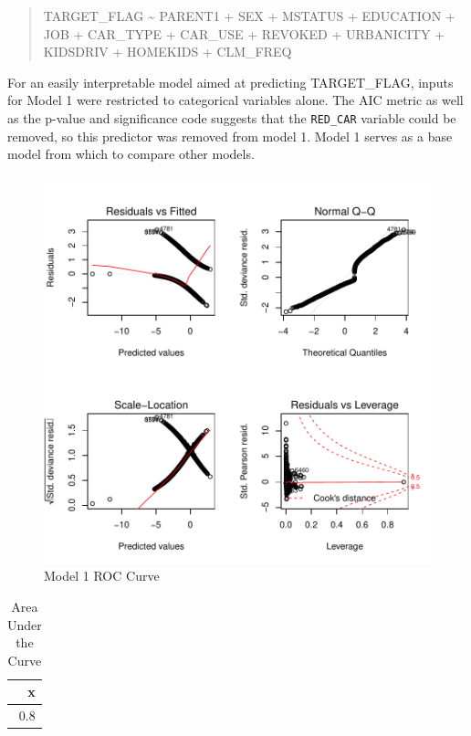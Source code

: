 \documentclass[]{article}
\begin{document}
\begin{quote}
TARGET\_FLAG \textasciitilde{} PARENT1 + SEX + MSTATUS + EDUCATION + JOB
+ CAR\_TYPE + CAR\_USE + REVOKED + URBANICITY + KIDSDRIV + HOMEKIDS +
CLM\_FREQ
\end{quote}

For an easily interpretable model aimed at predicting TARGET\_FLAG,
inputs for Model 1 were restricted to categorical variables alone. The
AIC metric as well as the p-value and significance code suggests that
the \texttt{RED\_CAR} variable could be removed, so this predictor was
removed from model 1. Model 1 serves as a base model from which to
compare other models.

\begin{figure}
\centering
\includegraphics{proj4_files/figure-latex/f11-1.pdf}
\caption{\label{fig:f11}Model 1 ROC Curve}
\end{figure}

\begin{table}

\caption{\label{tab:t5}Area Under the Curve}
\centering
\begin{tabular}[t]{r}
\hline
x\\
\hline
0.8\\
\hline
\end{tabular}
\end{table}
\end{document}

